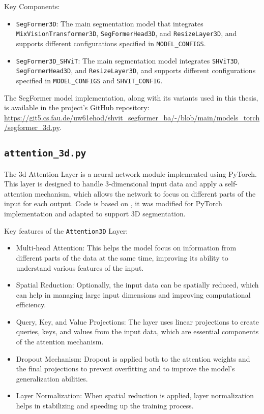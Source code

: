 \noindent Key Components:
\begin{itemize}
	\item {\tt SegFormer3D}: The main segmentation model that integrates {\tt MixVisionTransformer3D}, {\tt SegFormerHead3D}, and {\tt ResizeLayer3D}, and supports different configurations specified in {\tt MODEL\_CONFIGS}.

	\item {\tt SegFormer3D\_SHViT}: The main segmentation model integrates {\tt SHViT3D}, {\tt SegFormerHead3D}, and {\tt ResizeLayer3D}, and supports different configurations specified in {\tt MODEL\_CONFIGS} and {\tt SHVIT\_CONFIG}.
\end{itemize}

The SegFormer model implementation, along with its variants used in this thesis, is available in the project's GitHub repository: \url{https://git5.cs.fau.de/uw61ehod/shvit_segformer_ba/-/blob/main/models_torch/segformer_3d.py}.



\subsection{{\tt attention\_3d.py}}
The \gls{3d} Attention Layer is a neural network module implemented using PyTorch. This layer is designed to handle 3-dimensional input data and apply a self-attention mechanism, which allows the network to focus on different parts of the input for each output. Code is based on \cite{IMvision12}, it was modified for PyTorch implementation and adapted to support 3D segmentation.

\medskip

\noindent Key features of the {\tt Attention3D} Layer:
\begin{itemize}
	\item Multi-head Attention: This helps the model focus on information from different parts of the data at the same time, improving its ability to understand various features of the input.
	
	\item Spatial Reduction: Optionally, the input data can be spatially reduced, which can help in managing large input dimensions and improving computational efficiency.
	
	\item Query, Key, and Value Projections: The layer uses linear projections to create queries, keys, and values from the input data, which are essential components of the attention mechanism.
	
	\item Dropout Mechanism: Dropout is applied both to the attention weights and the final projections to prevent overfitting and to improve the model's generalization abilities.
	
	\item Layer Normalization: When spatial reduction is applied, layer normalization helps in stabilizing and speeding up the training process.
\end{itemize}

